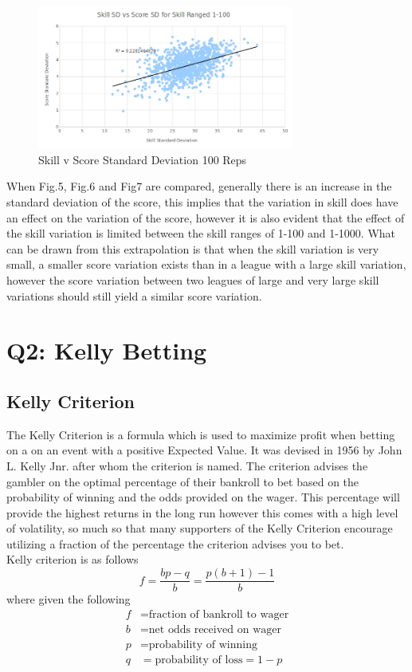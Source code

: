 \documentclass[12pt]{article}
\begin{document}
\begin{figure}[h]
\centering
\includegraphics[width=0.75\textwidth]{SD_score_skill.png}
\caption{Skill v Score Standard Deviation 100 Reps}
\end{figure}
When Fig.5, Fig.6 and Fig7 are compared, generally there is an increase in the standard deviation of the score, this implies that the variation in skill does have an effect on the variation of the score, however it is also evident that the effect of the skill variation is limited between the skill ranges of 1-100 and 1-1000. What can be drawn from this extrapolation is that when the skill variation is very small, a smaller score variation exists than in a league with a large skill variation, however the score variation between two leagues of large and very large skill variations should still yield a similar score variation.

\section{Q2: Kelly Betting}
\subsection{Kelly Criterion}
The Kelly Criterion is a formula which is used to maximize profit when betting on a on an event with a positive Expected Value. It was devised in 1956 by John L. Kelly Jnr. after whom the criterion is named. The criterion advises the gambler on the optimal percentage of their bankroll to bet based on the probability of winning and the odds provided on the wager. This percentage will provide the highest returns in the long run however this comes with a high level of volatility, so much so that many supporters of the Kelly Criterion encourage utilizing a fraction of the percentage the criterion advises you to bet.
\\
Kelly criterion is as follows
$$f=\frac{bp-q}{b}=\frac{p(b+1)-1}{b}$$
where given the following
\begin{align*}
f&=\text{fraction of bankroll to wager}\\
b&=\text{net odds received on wager}\\
p&=\text{probability of winning}\\
q&=\text{probability of loss}=1-p
\end{align*}
\end{document}
